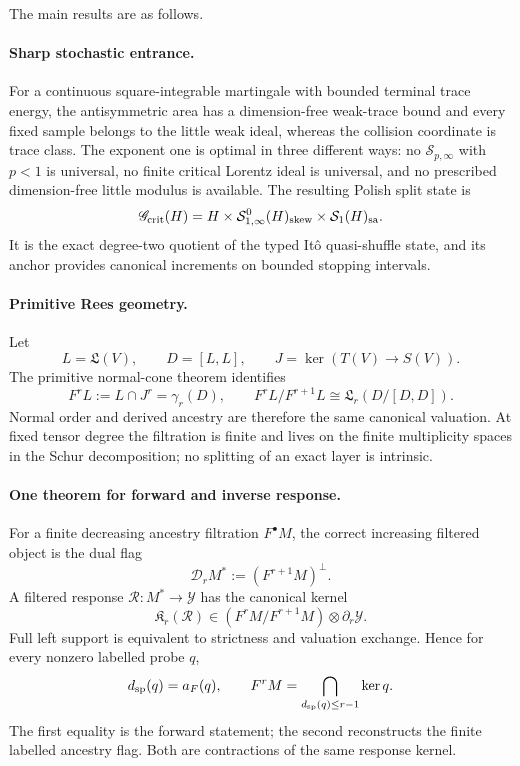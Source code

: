 \documentclass[10pt,reqno]{amsart}
\theoremstyle{plain}
\theoremstyle{definition}
\theoremstyle{remark}
\begin{document}
The main results are as follows.

\paragraph{Sharp stochastic entrance.}
For a continuous square-integrable martingale with bounded terminal trace
energy, the antisymmetric area has a dimension-free weak-trace bound and every
fixed sample belongs to the little weak ideal, whereas the collision
coordinate is trace class.  The exponent one is optimal in three different
ways: no $\mathcal S_{p,\infty}$ with $p<1$ is universal, no finite critical
Lorentz ideal is universal, and no prescribed dimension-free little modulus
is available.  The resulting Polish split state is
\begin{equation}
 \mathscr G_{\rm crit}(H)
 =H\times\mathcal S^0_{1,\infty}(H)_{\rm skew}
   \times\mathcal S_1(H)_{\rm sa}.
 \label{eq:intro-critical-state}
\end{equation}
It is the exact degree-two quotient of the typed It\^o quasi-shuffle state,
and its anchor provides canonical increments on bounded stopping intervals.

\paragraph{Primitive Rees geometry.}
Let
\[
 L=\mathfrak L(V),\qquad D=[L,L],\qquad
 J=\ker(T(V)\to S(V)).
\]
The primitive normal-cone theorem identifies
\begin{equation}
 F^rL:=L\cap J^r=\gamma_r(D),\qquad
 F^rL/F^{r+1}L\cong\mathfrak L_r(D/[D,D]).
 \label{eq:intro-normal-cone}
\end{equation}
Normal order and derived ancestry are therefore the same canonical valuation.
At fixed tensor degree the filtration is finite and lives on the finite
multiplicity spaces in the Schur decomposition; no splitting of an exact
layer is intrinsic.

\paragraph{One theorem for forward and inverse response.}
For a finite decreasing ancestry filtration $F^\bullet M$, the correct
increasing filtered object is the dual flag
\[
 \mathscr D_rM^*:=(F^{r+1}M)^\perp.
\]
A filtered response $\mathcal R:M^*\to\mathcal Y$ has the canonical kernel
\begin{equation}
 \mathfrak K_r(\mathcal R)
 \in (F^rM/F^{r+1}M)\otimes\partial_r\mathcal Y.
 \label{eq:intro-kernel}
\end{equation}
Full left support is equivalent to strictness and valuation exchange.  Hence
for every nonzero labelled probe $q$,
\begin{equation}
 d_{\rm sp}(q)=a_F(q),
 \qquad
 F^rM=\bigcap_{d_{\rm sp}(q)\le r-1}\ker q.
 \label{eq:intro-bidirectional}
\end{equation}
The first equality is the forward statement; the second reconstructs the
finite labelled ancestry flag.  Both are contractions of the same response kernel.
\end{document}
